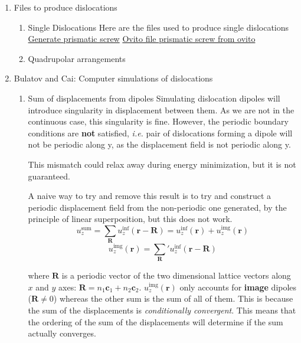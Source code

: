 \documentclass[11pt]{article}
\begin{document}
\begin{enumerate}
\item Files to produce dislocations
\label{sec:org2ad8cbf}
\begin{enumerate}
\item Single Dislocations
\label{sec:org5eaf3e8}
Here are the files used to produce single dislocations
\href{file:///home/tigany/Documents/disl\_gsurf/useful\_python/bop/dislocations/create\_dislocations/gen\_prismatic\_screw\_tbe.py}{Generate prismatic screw} \href{file:///home/tigany/Documents/disl\_gsurf/useful\_python/bop/dislocations/create\_dislocations/test/generated\_dislocations/site.ti\_9x\_9y\_8z\_square\_1\_dislanis\_prim\_rot\_convert.xyz}{Ovito file }
\href{file:///home/tigany/Pictures/prismatic\_screw\_tbe\_full\_anis.png}{prismatic screw from ovito }
\item Quadrupolar arrangements
\label{sec:org1d53958}
\end{enumerate}

\item Bulatov and Cai: Computer simulations of dislocations
\label{sec:org661bdbd}

\begin{enumerate}
\item Sum of displacements from dipoles
\label{sec:orgfebc801}
Simulating dislocation dipoles will introduce singularity in displacement
between them. As we are not in the continuous case, this singularity is
fine. However, the periodic boundary conditions are \textbf{not} satisfied,
\emph{i.e.} pair of dislocations forming a dipole will not be periodic
along y, as the displacement field is not periodic along y. 

This mismatch could relax away during energy minimization, but it is not
guaranteed. 

A naive way to try and remove this result is to try and construct a
periodic displacement field from the non-periodic one generated, by the
principle of linear superposition, but this does not work. 
\[ u_{z}^{\text{sum}} = \sum_{\mathbf{R}} u_{z}^{\inf}(\mathbf{r}
     -\mathbf{R}) = u_{z}^{\inf}(\mathbf{r}) + u_{z}^{\text{img}}(\mathbf{r})
     \]
\[  u_{z}^{\text{img}}(\mathbf{r}) = \sum_{\mathbf{R}}' u_{z}^{\inf}(\mathbf{r}
     -\mathbf{R}) \]

where \(\mathbf{R}\) is a periodic vector of the two dimensional lattice
vectors along \(x\) and \(y\) axes: \(\mathbf{R} = n_{1}\mathbf{c}_1 +
     n_{2}\mathbf{c}_2\).
\(u_{z}^{\text{img}}(\mathbf{r})\) only accounts for \textbf{image} dipoles
(\(\mathbf{R}\neq 0\))
whereas the other sum is the sum of all of them. 
This is because the sum of the displacements is \emph{conditionally
convergent}. This means that the ordering of the sum of the displacements
will determine if the sum actually converges.


\end{enumerate}
\end{enumerate}
\end{document}
